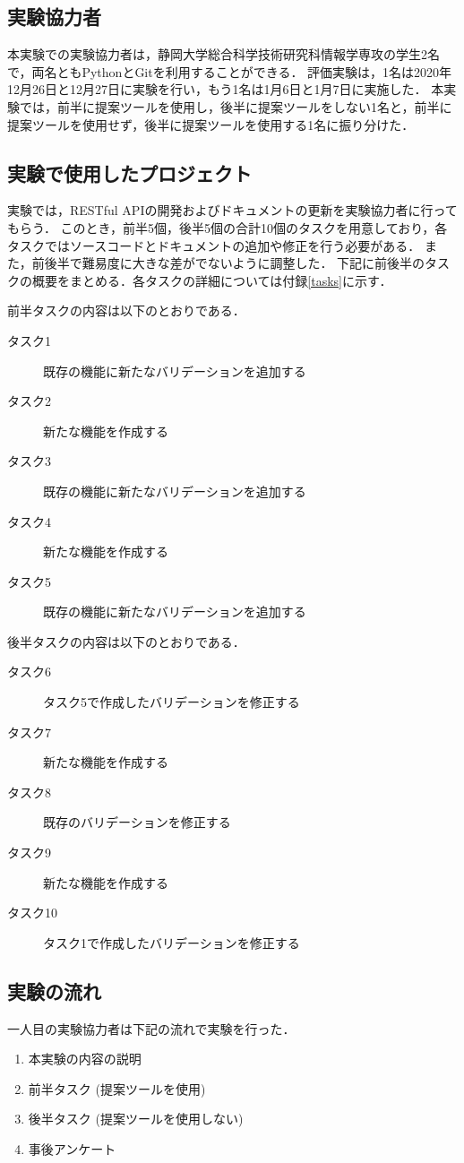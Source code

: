 \subsection{実験協力者}
本実験での実験協力者は，静岡大学総合科学技術研究科情報学専攻の学生2名で，両名ともPythonとGitを利用することができる．
評価実験は，1名は2020年12月26日と12月27日に実験を行い，もう1名は1月6日と1月7日に実施した．
本実験では，前半に提案ツールを使用し，後半に提案ツールをしない1名と，前半に提案ツールを使用せず，後半に提案ツールを使用する1名に振り分けた．

\subsection{実験で使用したプロジェクト}
実験では，RESTful APIの開発およびドキュメントの更新を実験協力者に行ってもらう．
このとき，前半5個，後半5個の合計10個のタスクを用意しており，各タスクではソースコードとドキュメントの追加や修正を行う必要がある．
また，前後半で難易度に大きな差がでないように調整した．
下記に前後半のタスクの概要をまとめる．各タスクの詳細については付録\ref{tasks}に示す．

前半タスクの内容は以下のとおりである．
\begin{description}
    \item[タスク1] 既存の機能に新たなバリデーションを追加する
    \item[タスク2] 新たな機能を作成する
    \item[タスク3] 既存の機能に新たなバリデーションを追加する
    \item[タスク4] 新たな機能を作成する
    \item[タスク5] 既存の機能に新たなバリデーションを追加する
\end{description}

後半タスクの内容は以下のとおりである．
\begin{description}
    \item[タスク6] タスク5で作成したバリデーションを修正する
    \item[タスク7] 新たな機能を作成する
    \item[タスク8] 既存のバリデーションを修正する
    \item[タスク9] 新たな機能を作成する
    \item[タスク10] タスク1で作成したバリデーションを修正する
\end{description}

\subsection{実験の流れ}
一人目の実験協力者は下記の流れで実験を行った．
\begin{enumerate}
    \item 本実験の内容の説明
    \item 前半タスク (提案ツールを使用)
    \item 後半タスク (提案ツールを使用しない)
    \item 事後アンケート
\end{enumerate}

